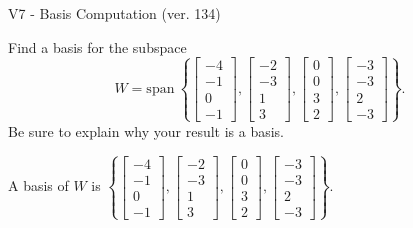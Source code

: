 \begin{exercise}
  \begin{exerciseTitle}V7 - Basis Computation (ver. 134)\end{exerciseTitle}
  \begin{exerciseStatement}
    Find a basis for the subspace 
\[W=\mathrm{span}\ \left\{\left[\begin{array}{r}
-4 \\
-1 \\
0 \\
-1
\end{array}\right] , \left[\begin{array}{r}
-2 \\
-3 \\
1 \\
3
\end{array}\right] , \left[\begin{array}{r}
0 \\
0 \\
3 \\
2
\end{array}\right] , \left[\begin{array}{r}
-3 \\
-3 \\
2 \\
-3
\end{array}\right]\right\}.\]
 Be sure to explain why your result is a basis.


  \end{exerciseStatement}
  \begin{exerciseAnswer}
   A basis of \(W\) is  \(\left\{\left[\begin{array}{r}
-4 \\
-1 \\
0 \\
-1
\end{array}\right] , \left[\begin{array}{r}
-2 \\
-3 \\
1 \\
3
\end{array}\right] , \left[\begin{array}{r}
0 \\
0 \\
3 \\
2
\end{array}\right] , \left[\begin{array}{r}
-3 \\
-3 \\
2 \\
-3
\end{array}\right]\right\}\).
  


  \end{exerciseAnswer}
\end{exercise}
